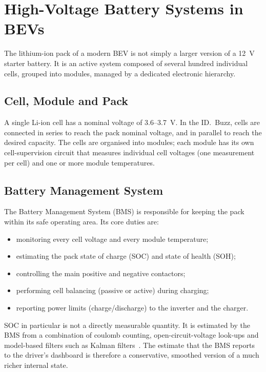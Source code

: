 \documentclass[11pt,a4paper,oneside,parskip=half]{scrreprt}
\begin{document}
\section{High-Voltage Battery Systems in BEVs}
The lithium-ion pack of a modern BEV is not simply a larger version of a 12~V starter battery. It is an active system composed of several hundred individual cells, grouped into modules, managed by a dedicated electronic hierarchy.

\subsection{Cell, Module and Pack}
A single Li-ion cell has a nominal voltage of 3.6--3.7~V. In the ID.~Buzz, cells are connected in series to reach the pack nominal voltage, and in parallel to reach the desired capacity. The cells are organised into modules; each module has its own cell-supervision circuit that measures individual cell voltages (one measurement per cell) and one or more module temperatures.

\subsection{Battery Management System}
The Battery Management System (BMS) is responsible for keeping the pack within its safe operating area. Its core duties are:

\begin{itemize}
  \item monitoring every cell voltage and every module temperature;
  \item estimating the pack state of charge (SOC) and state of health (SOH);
  \item controlling the main positive and negative contactors;
  \item performing cell balancing (passive or active) during charging;
  \item reporting power limits (charge/discharge) to the inverter and the charger.
\end{itemize}

SOC in particular is not a directly measurable quantity. It is estimated by the BMS from a combination of coulomb counting, open-circuit-voltage look-ups and model-based filters such as Kalman filters~\cite{weng2014unified,xiong2018critical,park2021data}. The estimate that the BMS reports to the driver's dashboard is therefore a conservative, smoothed version of a much richer internal state.
\end{document}
